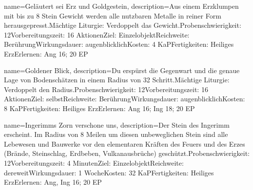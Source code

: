 {
    name={Geläutert sei Erz und Goldgestein},
    description={Aus einem Erzklumpen mit bis zu 8 Stein Gewicht werden alle nutzbaren Metalle in reiner Form herausgepresst.\newline Mächtige Liturgie: Verdoppelt das Gewicht.\newline Probenschwierigkeit: 12\newline Vorbereitungszeit: 16 Aktionen\newline Ziel: Einzelobjekt\newline Reichweite: Berührung\newline Wirkungsdauer: augenblicklich\newline Kosten: 4 KaP\newline Fertigkeiten: Heiliges Erz\newline Erlernen: Ang 16; 20 EP}
}


{
    name={Goldener Blick},
    description={Du erspürst die Gegenwart und die genaue Lage von Bodenschätzen in einem Radius von 32 Schritt.\newline Mächtige Liturgie: Verdoppelt den Radius.\newline Probenschwierigkeit: 12\newline Vorbereitungszeit: 16 Aktionen\newline Ziel: selbst\newline Reichweite: Berührung\newline Wirkungsdauer: augenblicklich\newline Kosten: 8 KaP\newline Fertigkeiten: Heiliges Erz\newline Erlernen: Ang 16; Ing 18; 20 EP}
}


{
    name={Ingerimms Zorn verschone uns},
    description={Der Stein des Ingerimm erscheint. Im Radius von 8 Meilen um diesen unbeweglichen Stein sind alle Lebewesen und Bauwerke vor den elementaren Kräften des Feuers und des Erzes (Brände, Steinschlag, Erdbeben, Vulkanausbrüche) geschützt.\newline Probenschwierigkeit: 12\newline Vorbereitungszeit: 4 Minuten\newline Ziel: Einzelobjekt\newline Reichweite: dereweit\newline Wirkungsdauer: 1 Woche\newline Kosten: 32 KaP\newline Fertigkeiten: Heiliges Erz\newline Erlernen: Ang, Ing 16; 20 EP}
}


